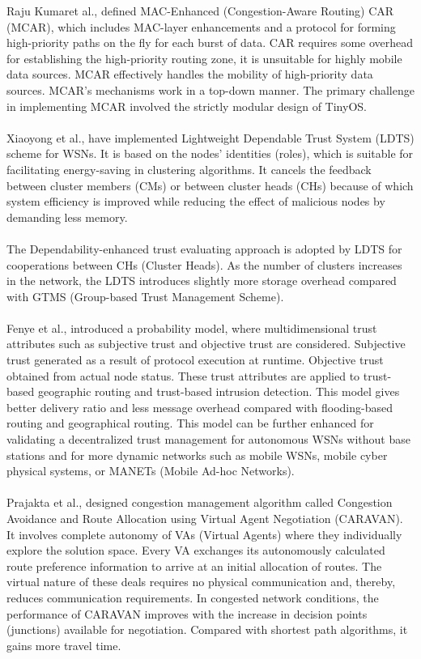 \documentclass[journal]{IEEEtran}
\begin{document}
\indent Raju Kumaret al., \cite{MCAR} defined MAC-Enhanced (Congestion-Aware Routing) CAR (MCAR), which includes MAC-layer enhancements and a protocol for forming high-priority paths on the fly for each burst of data. CAR requires some overhead for establishing the high-priority routing zone, it is unsuitable for highly mobile data sources. MCAR effectively handles the mobility of high-priority data sources. MCAR’s mechanisms work in a top-down manner. The primary challenge in implementing MCAR involved the strictly modular design of TinyOS.\\ \\
\indent Xiaoyong et al., \cite{LDTS} have implemented Lightweight Dependable Trust System (LDTS) scheme for WSNs. It is based on the nodes’ identities (roles), which is suitable for facilitating energy-saving in clustering algorithms. It cancels the feedback between cluster members (CMs) or between cluster heads (CHs) because of which system efficiency is improved while reducing the effect of malicious nodes by demanding less memory. \\ \\
\indent The Dependability-enhanced trust evaluating approach is adopted by LDTS for cooperations between CHs (Cluster Heads). As the number of clusters increases in the network, the LDTS introduces slightly more storage overhead compared with GTMS (Group-based Trust Management Scheme).\\ \\
\indent Fenye et al., \cite{Trust} introduced a probability model, where multidimensional trust attributes such as subjective trust and objective trust are considered. Subjective trust generated as a result of protocol execution at runtime. Objective trust obtained from actual node status. These trust attributes are applied to trust-based geographic routing and trust-based intrusion detection. This model gives better delivery ratio and less message overhead compared with flooding-based routing and geographical routing. This model can be further enhanced for validating a decentralized trust management for autonomous WSNs without base stations and for more dynamic networks such as mobile WSNs, mobile cyber physical systems, or MANETs (Mobile Ad-hoc Networks).\\ \\
\indent Prajakta et al., \cite{CARAVAN} designed congestion management algorithm called Congestion Avoidance and Route Allocation using Virtual Agent Negotiation (CARAVAN). It involves complete autonomy of VAs (Virtual Agents) where they individually explore the solution space. Every VA exchanges its autonomously calculated route preference information to arrive at an initial allocation of routes. The virtual nature of these deals requires no physical communication and, thereby, reduces communication requirements. In congested network conditions, the performance of CARAVAN improves with the increase in decision points (junctions) available for negotiation. Compared with shortest path algorithms, it gains more travel time.\\ \\
\end{document}
